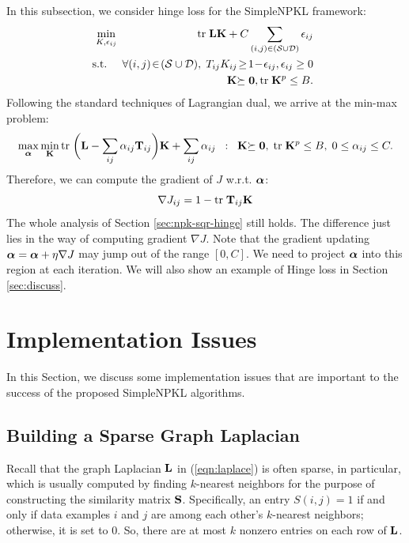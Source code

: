In this subsection, we consider hinge loss for the SimpleNPKL framework:
\begin{eqnarray}
\!& \!\min_{K, \epsilon_{ij}}\!&\!\tr \L\K + C \sum_{(i,j)\in(\SS\cup\DD)}\epsilon_{ij} \nonumber\\%
\!\!&\!\!\mbox{s.t.}\!\!&\!\!\forall (i,j)\!\in \!(\SS\cup\DD),
                                 \; T_{ij}K_{ij}\! \geq \! 1 \! - \!\epsilon_{ij}, \epsilon_{ij} \geq 0\nonumber\\
\!&\!\!  &\K\psd, \tr \K^p \leq B.
\nonumber
\end{eqnarray}
Following the standard techniques of Lagrangian dual, we arrive at the min-max
problem:
\begin{eqnarray}
\max_{\ba}\min_\K \tr\bigg(\L-\sum_{ij} \a_{ij}\T_{ij} \bigg) \K + \sum_{ij}\a_{ij}\;\;:\;\;\K\psd,\;\tr\K^p\leq B,\; 0 \leq \a_{ij} \leq C.\nonumber
\end{eqnarray}
Therefore, we can compute the gradient of $J$ w.r.t. $\ba$:
\[
\nabla J_{ij} = 1 -\tr \T_{ij}\K
\]
The whole analysis of Section \ref{sec:npk-sqr-hinge} still holds. The difference just
lies in the way of computing gradient $\nabla J$. Note that the gradient updating $\ba =
\ba + \eta\nabla\J$ may jump out of the range $[0, C]$. We need to project $\ba$ into
this region at each iteration. We will also show an example of Hinge loss in Section
\ref{sec:discuss}.

\section{Implementation Issues}\label{sec:implement}

In this Section, we discuss some implementation issues that are important to the success of the proposed SimpleNPKL algorithms.

\subsection{Building a Sparse Graph Laplacian}

Recall that the graph Laplacian $\L$ in (\ref{eqn:laplace}) is often sparse, in particular, which is usually
computed by finding $k$-nearest neighbors for the purpose of constructing the
similarity matrix $\S$. Specifically, an entry $S(i,j)=1$ if and only if data examples $i$ and $j$ are
among each other's $k$-nearest neighbors; otherwise, it is set to 0. So, there are at
most $k$ nonzero entries on each row of $\L$.

